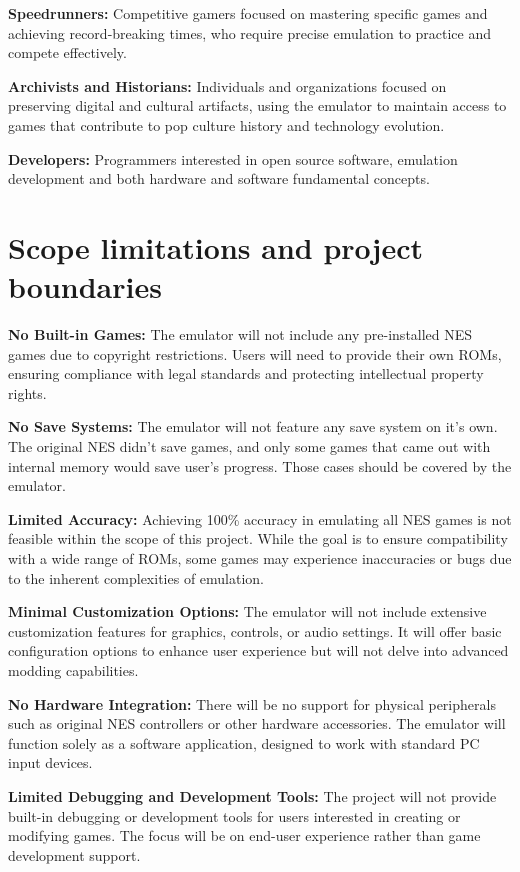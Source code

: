 \documentclass{article}
\begin{document}
\noindent\textbf{Speedrunners:} Competitive gamers focused on mastering specific games and achieving record-breaking times, who require precise emulation to practice and compete effectively.

\noindent\textbf{Archivists and Historians:} Individuals and organizations focused on preserving digital and cultural artifacts, using the emulator to maintain access to games that contribute to pop culture history and technology evolution.

\noindent\textbf{Developers:} Programmers interested in open source software, emulation development and both hardware and software fundamental concepts.

\section{Scope limitations and project boundaries}
\textbf{No Built-in Games:} The emulator will not include any pre-installed NES games due to copyright restrictions. Users will need to provide their own ROMs, ensuring compliance with legal standards and protecting intellectual property rights.

\noindent\textbf{No Save Systems:} The emulator will not feature any save system on it's own. The original NES didn't save games, and only some games that came out with internal memory would save user's progress. Those cases should be covered by the emulator.

\noindent\textbf{Limited Accuracy:} Achieving 100\% accuracy in emulating all NES games is not feasible within the scope of this project. While the goal is to ensure compatibility with a wide range of ROMs, some games may experience inaccuracies or bugs due to the inherent complexities of emulation.

\noindent\textbf{Minimal Customization Options:} The emulator will not include extensive customization features for graphics, controls, or audio settings. It will offer basic configuration options to enhance user experience but will not delve into advanced modding capabilities.

\noindent\textbf{No Hardware Integration:} There will be no support for physical peripherals such as original NES controllers or other hardware accessories. The emulator will function solely as a software application, designed to work with standard PC input devices.

\noindent\textbf{Limited Debugging and Development Tools:} The project will not provide built-in debugging or development tools for users interested in creating or modifying games. The focus will be on end-user experience rather than game development support.
\end{document}
